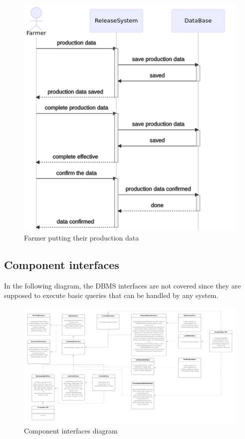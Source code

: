 \begin{figure} [H]
	\centering
	\includegraphics[width=\textwidth]{Images/seq_request_prod_data.png}
	\caption{\label{fig:seq_request_prod_data} Farmer putting their production data}
\end{figure}
\subsection{Component interfaces}
In the following diagram, the DBMS interfaces are not covered since they are supposed to execute basic queries that can be handled by any system.

\begin{figure} [H]
	\centering
	\includegraphics[width=\textwidth]{Images/component-interfaces-diagram.png}
	\caption{\label{fig:component_interfaces_diag} Component interfaces diagram}
\end{figure}

